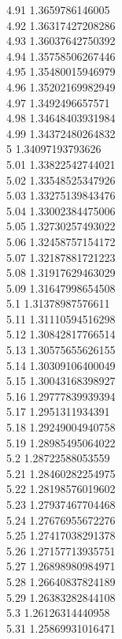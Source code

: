 {4.91	1.3659786146005\\
4.92	1.36317427208286\\
4.93	1.36037642750392\\
4.94	1.35758506267446\\
4.95	1.35480015946979\\
4.96	1.35202169982949\\
4.97	1.3492496657571\\
4.98	1.34648403931984\\
4.99	1.34372480264832\\
5	1.34097193793626\\
5.01	1.33822542744021\\
5.02	1.33548525347926\\
5.03	1.33275139843476\\
5.04	1.33002384475006\\
5.05	1.32730257493022\\
5.06	1.32458757154172\\
5.07	1.32187881721223\\
5.08	1.31917629463029\\
5.09	1.31647998654508\\
5.1	1.31378987576611\\
5.11	1.31110594516298\\
5.12	1.30842817766514\\
5.13	1.30575655626155\\
5.14	1.30309106400049\\
5.15	1.30043168398927\\
5.16	1.29777839939394\\
5.17	1.2951311934391\\
5.18	1.29249004940758\\
5.19	1.28985495064022\\
5.2	1.28722588053559\\
5.21	1.28460282254975\\
5.22	1.28198576019602\\
5.23	1.27937467704468\\
5.24	1.27676955672276\\
5.25	1.27417038291378\\
5.26	1.27157713935751\\
5.27	1.26898980984971\\
5.28	1.26640837824189\\
5.29	1.26383282844108\\
5.3	1.26126314440958\\
5.31	1.25869931016471\\
}
